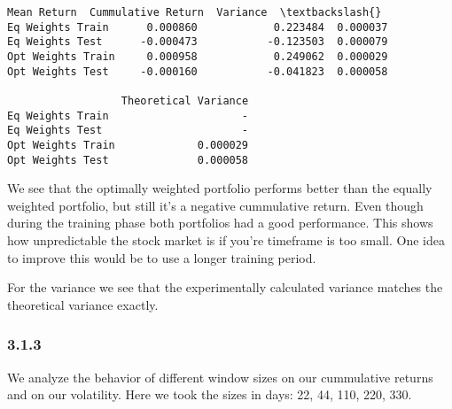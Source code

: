 \documentclass[11pt]{article}
\makeatletter
\newcommand{\boxspacing}{\kern\kvtcb@left@rule\kern\kvtcb@boxsep}
\newcommand{\prompt}[4]{
        {\ttfamily\llap{{\color{#2}[#3]:\hspace{3pt}#4}}\vspace{-\baselineskip}}
    }
\makeatother
\begin{document}
            \begin{tcolorbox}[breakable, size=fbox, boxrule=.5pt, pad at break*=1mm, opacityfill=0]
\prompt{Out}{outcolor}{119}{\boxspacing}
\begin{Verbatim}[commandchars=\\\{\}]
                   Mean Return  Cummulative Return  Variance  \textbackslash{}
Eq Weights Train      0.000860            0.223484  0.000037
Eq Weights Test      -0.000473           -0.123503  0.000079
Opt Weights Train     0.000958            0.249062  0.000029
Opt Weights Test     -0.000160           -0.041823  0.000058

                  Theoretical Variance
Eq Weights Train                     -
Eq Weights Test                      -
Opt Weights Train             0.000029
Opt Weights Test              0.000058
\end{Verbatim}
\end{tcolorbox}
        
    We see that the optimally weighted portfolio performs better than the
equally weighted portfolio, but still it's a negative cummulative
return. Even though during the training phase both portfolios had a good
performance. This shows how unpredictable the stock market is if you're
timeframe is too small. One idea to improve this would be to use a
longer training period.

For the variance we see that the experimentally calculated variance
matches the theoretical variance exactly.

    \hypertarget{section}{%
\subsubsection{3.1.3}\label{section}}

    We analyze the behavior of different window sizes on our cummulative
returns and on our volatility. Here we took the sizes in days: 22, 44,
110, 220, 330.
\end{document}
